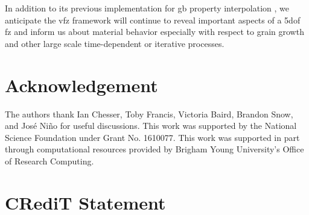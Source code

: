 \documentclass[final,twocolumn,12pt]{elsarticle}
\begin{document}
	In addition to its previous implementation for \gls{gb} property interpolation \cite{bairdFiveDegreeofFreedomPropertyUnderReview}, we anticipate the \gls{vfz} framework will continue to reveal important aspects of a \gls{5dof} \gls{fz} and inform us about material behavior especially with respect to grain growth and other large scale time-dependent or iterative processes.

	\section*{Acknowledgement}
	\label{sec:acknowledgement}
	
	The authors thank Ian Chesser, Toby Francis, Victoria Baird, Brandon Snow, and José Niño for useful discussions. This work was supported by the National Science Foundation under Grant No. 1610077. This work was supported in part through computational resources provided by Brigham Young University's Office of Research Computing.
	\section*{CRediT Statement}
	
	
	
	\begin{appendices}
		
		
	\end{appendices}
	
	\printglossaries
	
	
	
	
	
\end{document}
